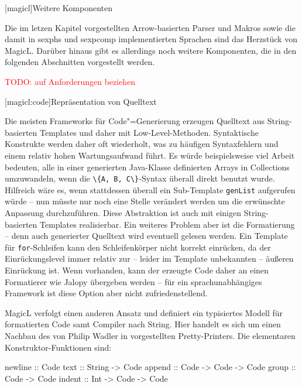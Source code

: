 \documentclass[12pt, a4paper, bibgerm]{scrbook}
\newenvironment{DIFnomarkup}{}{}
\newcommand\icode[1]{\lstinline?#1?}
\newcommand{\todo}[1]{
  \textcolor{red}{TODO: #1}
}
\newcommand\lchapter{}
\newcommand\lsection{}
\newcommand\cref{}
\newcommand{\cgen}{Code"=Generierung}
\begin{document}
\lchapter[magicl]{Weitere Komponenten}

Die im letzen Kapitel vorgestellten Arrow-basierten Parser und Makros
sowie die damit in \cref{sexphs} und \cref{sexpcomp} implementierten
Sprachen sind das Herzstück von MagicL. Darüber hinaus gibt es
allerdings noch weitere Komponenten, die in den folgenden Abschnitten
vorgestellt werden.

\todo{auf Anforderungen beziehen}

\lsection[magicl:code]{Repräsentation von Quelltext}

Die meisten Frameworks für \cgen{} erzeugen Quelltext aus
String-basierten Templates und daher mit
Low-Level-Methoden. Syntaktische Konstrukte werden daher oft wiederholt,
was zu häufigen Syntaxfehlern und einem relativ hohen Wartungsaufwand
führt. Es würde beispielsweise viel Arbeit bedeuten, alle in einer
generierten Java-Klasse definierten Arrays in Collections umzuwandeln,
wenn die \icode{\{A, B, C\}}-Syntax überall direkt benutzt
wurde. Hilfreich wäre es, wenn stattdessen überall ein Sub-Template
\icode{genList} aufgerufen würde -- nun müsste nur noch eine Stelle
verändert werden um die erwünschte Anpassung durchzuführen. Diese
Abstraktion ist auch mit einigen String-basierten Templates
realisierbar. Ein weiteres Problem aber ist die Formatierung -- denn auch
generierter Quelltext wird eventuell gelesen werden. Ein Template für
\icode{for}-Schleifen kann den Schleifenkörper nicht korrekt einrücken,
da der Einrückungslevel immer relativ zur -- leider im Template
unbekannten -- äußeren Einrückung ist.  Wenn vorhanden, kann der erzeugte
Code daher an einen Formatierer wie Jalopy \cite{Jalopy} übergeben werden --
für ein sprachunabhängiges Framework ist diese Option aber nicht
zufriedenstellend.

MagicL verfolgt einen anderen Ansatz und definiert ein typisiertes
Modell für formatierten Code samt Compiler nach String. Hier handelt es
sich um einen Nachbau des von Philip Wadler in
\cite[S.223ff]{FunOfProgramming} vorgestellten Pretty-Printers. Die
elementaren Konstruktor-Funktionen sind:
\begin{DIFnomarkup}\begin{code}
newline :: Code
text    :: String -> Code
append  :: Code   -> Code -> Code
group   :: Code   -> Code
indent  :: Int    -> Code -> Code
\end{code}\end{DIFnomarkup}
\end{document}
